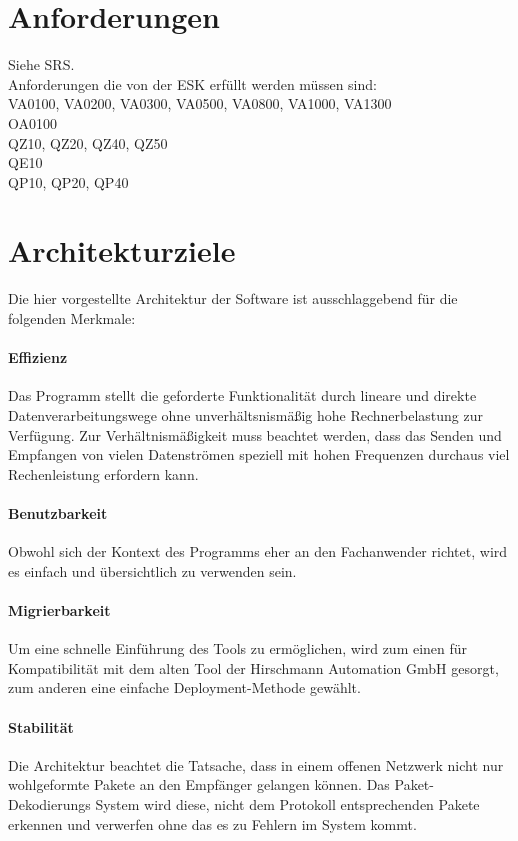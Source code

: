 \section{Anforderungen}
Siehe SRS.\\
Anforderungen die von der ESK erfüllt werden müssen sind:\\
VA0100, VA0200, VA0300, VA0500, VA0800, VA1000, VA1300\\
OA0100\\
QZ10, QZ20, QZ40, QZ50\\
QE10\\
QP10, QP20, QP40

\section{Architekturziele}
\label{sec:1:arch}

Die hier vorgestellte Architektur der Software ist ausschlaggebend für die
folgenden Merkmale:

\paragraph{Effizienz} Das Programm stellt die geforderte Funktionalität durch
lineare und direkte Datenverarbeitungswege ohne unverhältsnismäßig hohe
Rechnerbelastung zur Verfügung. Zur Verhältnismäßigkeit muss beachtet werden,
dass das Senden und Empfangen von vielen Datenströmen speziell mit hohen
Frequenzen durchaus viel Rechenleistung erfordern kann.

\paragraph{Benutzbarkeit} Obwohl sich der Kontext des Programms eher an den
Fachanwender richtet, wird es einfach und übersichtlich zu verwenden sein.

\paragraph{Migrierbarkeit} Um eine schnelle Einführung des Tools zu ermöglichen,
wird zum einen für Kompatibilität mit dem alten Tool der Hirschmann Automation
GmbH gesorgt, zum anderen eine einfache Deployment-Methode gewählt.

\paragraph{Stabilität} Die Architektur beachtet die Tatsache, dass in einem
offenen Netzwerk nicht nur wohlgeformte Pakete an den Empfänger gelangen können.
Das Paket-Dekodierungs System wird diese, nicht dem Protokoll
entsprechenden Pakete erkennen und verwerfen ohne das es zu Fehlern im System
kommt.

